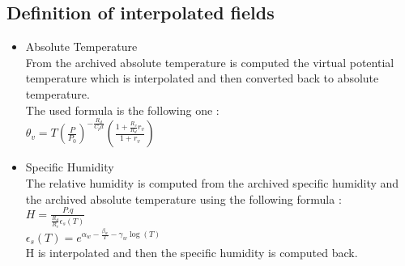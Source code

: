 \subsection{Definition of interpolated fields}
\begin{itemize}
\item Absolute Temperature\\
From the archived absolute temperature is computed the virtual potential temperature
which is interpolated and then converted back to absolute temperature.\\
The used formula is the following one :\\
$\theta_v = T ( \frac{P}{P_0})^{-\frac{R_d}{C_pd}} (\frac{1+\frac{R_v}{R_d}r_v}{1+r_v})$

\item Specific Humidity\\
The relative humidity is computed from the archived specific humidity and the archived
absolute temperature using the following formula :\\
$H=\frac{P.q}{\frac{R_d}{R_v}\epsilon_s(T)}$\\
$\epsilon_s(T)=e^{\alpha_w-\frac{\beta_w}{T}-\gamma_w\log(T)}$\\
H is interpolated and then the specific humidity is computed back.


\end{itemize}

